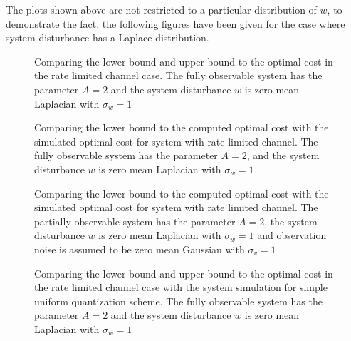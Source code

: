 \documentclass[12pt]{caltech_thesis_progress2}
\begin{document}
		The plots shown above are not restricted to a particular distribution of $w$, to demonstrate the fact, the following figures have been given for the case where system disturbance has a Laplace distribution. 
		\begin{figure}[H]

			  \centering
%			  
			  \tiny{
			}
			  \caption{Comparing the lower bound and upper bound to the optimal cost in the rate limited channel case. The fully observable system has the parameter $A = 2$ and the system disturbance $w$ is zero mean Laplacian with $\sigma_{w} = 1$}
			 \label{lower_upper}
		\end{figure}	
		\begin{figure}[H]
			  \centering
%			  
			  \tiny{
			}
			  \caption{Comparing the lower bound to the computed optimal cost with the simulated optimal cost for system with rate limited channel. The fully observable system has the parameter $A = 2$, and the system disturbance $w$ is zero mean Laplacian with $\sigma_{w} = 1$}
			 \label{lowerboundQL_sim}
		\end{figure}	
		\begin{figure}[H]
			  \centering
%			  
			  \tiny{
			}
			  \caption{Comparing the lower bound to the computed optimal cost with the simulated optimal cost for system with rate limited channel. The partially observable system has the parameter $A = 2$, the system disturbance $w$ is zero mean Laplacian with $\sigma_{w} = 1$ and observation noise is assumed to be zero mean Gaussian with $\sigma_{v} = 1$}
			 \label{lowerboundQL_sim_v}
		\end{figure}	
%
		\begin{figure}[H]
			  \centering
%			  
			  \tiny{
			}
			  \caption{Comparing the lower bound and upper bound to the optimal cost in the rate limited channel case with the system simulation for simple uniform quantization scheme. The fully observable system has the parameter $A = 2$ and the system disturbance $w$ is zero mean Laplacian with $\sigma_{w} = 1$}
			 \label{lower_upper_simL}
		\end{figure}		
\end{document}
